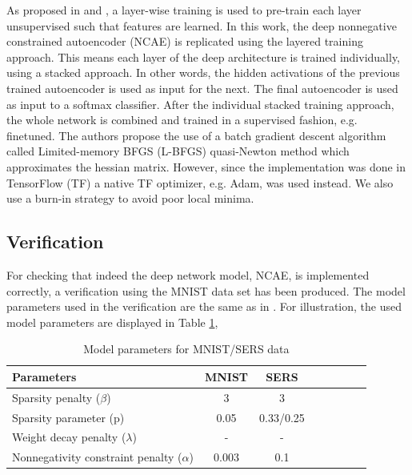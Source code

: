 \documentclass{article}
\begin{document}
As proposed in \cite{Hosseini-Asl2016} and \cite{Vincent}, a layer-wise training is used to pre-train each layer unsupervised such that features are learned. In this work, the deep nonnegative constrained autoencoder (NCAE) is replicated using the layered training approach. This means each layer of the deep architecture is trained individually, using a stacked approach. In other words, the hidden activations of the previous trained autoencoder is used as input for the next. The final autoencoder is used as input to a softmax classifier. After the individual stacked training approach, the whole network is combined and trained in a supervised fashion, e.g. finetuned. The authors propose the use of a batch gradient descent algorithm called Limited-memory BFGS (L-BFGS) quasi-Newton method which approximates the hessian matrix. However, since the implementation was done in TensorFlow (TF) a native TF optimizer, e.g. Adam, was used instead. We also use a  burn-in strategy to avoid poor local minima. 

\subsection{Verification}

For checking that indeed the deep network model, NCAE, is implemented correctly, a verification using the MNIST data set has been produced. The model parameters used in the verification are the same as in \cite{Hosseini-Asl2016}. For illustration, the used model parameters are displayed in Table \ref{tab:parameters},

\begin{table}[h]
	\centering
\begin{tabular}{l*{6}{c}r}
	\hline
	Parameters             & MNIST & SERS \\
	\hline
	Sparsity penalty ($\beta$) & 3 & 3\\
	\hline
	Sparsity parameter (p)            & 0.05 & 0.33/0.25  \\
	\hline
	Weight decay penalty ($\lambda$)           & - & - \\
	\hline
	Nonnegativity constraint penalty ($\alpha$)     & 0.003 & 0.1\\
	\hline
\end{tabular}
   \caption{Model parameters for MNIST/SERS data}
\label{tab:parameters} 
\end{table}
\end{document}
